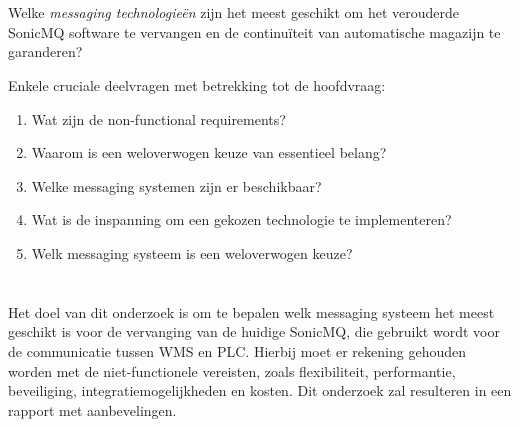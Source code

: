  
\section{}%
\label{sec:Onderzoeksvraag}


Welke \emph{messaging technologieën} zijn het meest geschikt om het verouderde SonicMQ software te vervangen 
en de continuïteit van automatische magazijn te garanderen?
\newline

Enkele cruciale deelvragen met betrekking tot de hoofdvraag:
\begin{enumerate} 
  \item Wat zijn de non-functional requirements?
  \item Waarom is een weloverwogen keuze van essentieel belang?
  \item Welke messaging systemen zijn er beschikbaar?
  \item Wat is de inspanning om een gekozen technologie te implementeren?
  \item Welk messaging systeem is een weloverwogen keuze?
\end{enumerate}


\section{}%
\label{sec:Onderzoeksdoelstelling}


Het doel van dit onderzoek is om te bepalen welk messaging systeem het meest geschikt is voor de vervanging van de huidige SonicMQ,
die gebruikt wordt voor de communicatie tussen WMS en PLC. 
Hierbij moet er rekening gehouden worden met de niet-functionele vereisten,
zoals flexibiliteit, performantie, beveiliging, integratiemogelijkheden en kosten.
Dit onderzoek zal resulteren in een rapport met aanbevelingen.

